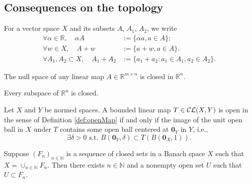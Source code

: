 \subsection{Consequences on the topology}

\begin{ntn}
  \label{ntn:setLinearOpNotation}
  For a vector space $X$ and 
  its subsets $A$, $A_1$, $A_2$, 
  we write
    \begin{equation}
    \label{eq:setLinearOpNotation}
      \begin{array}{rl}
        \forall \alpha\in \mathbb{R},
        \quad \alpha A &:= \{\alpha a, a\in A\};
        \\
        \forall w\in X,\quad 
        A + w &:= \{a+w, a\in A\}.
        \\
        \forall A_1, A_2 \subset X,\quad 
        A_1 + A_2 &:= \{a_1+a_2: a_1\in A_1, a_2\in A_2\}.
      \end{array}
  \end{equation}
\end{ntn}

\begin{lem}
  \label{lem:KernelIsClosed}
  The null space of any linear map $A\in \mathbb{R}^{m\times n}$
  is closed in $\mathbb{R}^n$.
\end{lem}

\begin{thm}
  \label{thm:finiteDimSubspaceIsClosed}
  Every subspace of $\mathbb{R}^n$ is closed.
\end{thm}

\begin{lem}
  \label{lem:openMapCharInNormedSpaces}
  Let $X$ and $Y$ be normed spaces.
  A bounded linear map $T\in {\cal CL}(X,Y)$ is open
  in the sense of Definition \ref{def:openMap}
  if and only if the image of the unit open ball in $X$ under $T$
  contains some open ball centered at $\mathbf{0}_Y$ in $Y$, i.e.,
  \begin{equation}
    \label{eq:openMapCharInNormedSpaces}
    \exists \delta>0 \text{ s.t. }
    B(\mathbf{0}_Y, \delta) \subset T\left({B(\mathbf{0}_X,1)}\right).
  \end{equation}
\end{lem}

\begin{thm}[Baire]
  \label{thm:Baire}
  Suppose $(F_n)_{n\in \mathbb{N}}$ is a sequence of closed sets
  in a Banach space $X$ such that $X=\cup_{n\in \mathbb{N}} F_n$.
  Then there exists $n\in \mathbb{N}$
  and a nonempty open set $U$ such that $U\subset F_n$.
\end{thm}

